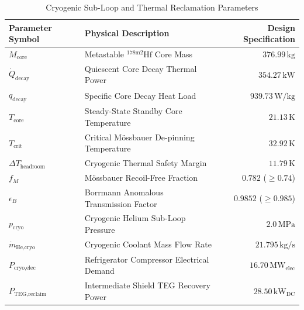 \documentclass[11pt,journal,compsoc]{IEEEtran}
\begin{document}
\begin{table}[htbp]
\centering
\small
\caption{Cryogenic Sub-Loop and Thermal Reclamation Parameters}
\label{tab:cryo_parameters}
\begin{tabular}{llr}
\hline
\textbf{Parameter Symbol} & \textbf{Physical Description} & \textbf{Design Specification} \\
\hline
$M_{\text{core}}$ & Metastable $^{178\mathrm{m}2}\text{Hf}$ Core Mass & $376.99\,\text{kg}$ \\
$\dot{Q}_{\text{decay}}$ & Quiescent Core Decay Thermal Power & $354.27\,\text{kW}$ \\
$q_{\text{decay}}$ & Specific Core Decay Heat Load & $939.73\,\text{W/kg}$ \\
$T_{\text{core}}$ & Steady-State Standby Core Temperature & $21.13\,\text{K}$ \\
$T_{\text{crit}}$ & Critical Mössbauer De-pinning Temperature & $32.92\,\text{K}$ \\
$\Delta T_{\text{headroom}}$ & Cryogenic Thermal Safety Margin & $11.79\,\text{K}$ \\
$f_M$ & Mössbauer Recoil-Free Fraction & $0.782$ ($\ge 0.74$) \\
$\epsilon_B$ & Borrmann Anomalous Transmission Factor & $0.9852$ ($\ge 0.985$) \\
$p_{\text{cryo}}$ & Cryogenic Helium Sub-Loop Pressure & $2.0\,\text{MPa}$ \\
$\dot{m}_{\text{He,cryo}}$ & Cryogenic Coolant Mass Flow Rate & $21.795\,\text{kg/s}$ \\
$P_{\text{cryo,elec}}$ & Refrigerator Compressor Electrical Demand & $16.70\,\text{MW}_{\text{elec}}$ \\
$P_{\text{TEG,reclaim}}$ & Intermediate Shield TEG Recovery Power & $28.50\,\text{kW}_{\text{DC}}$ \\
\hline
\end{tabular}
\end{table}
\end{document}

